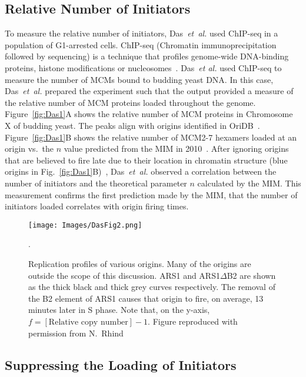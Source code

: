 {		\subsection{Relative Number of Initiators}
		\label{subsec:RelativeNo}
		
		To measure the relative number of initiators, Das~\emph{et~al.} used ChIP-seq in a population of G1-arrested cells.
		ChIP-seq (Chromatin immunoprecipitation followed by sequencing) is a technique that profiles genome-wide DNA-binding proteins, histone modifications or nucleosomes~\cite{ChIP-seq}.
		Das~\emph{et al.} used ChIP-seq to measure the number of MCMs bound to budding yeast DNA.
		In this case, Das~\emph{et~al.} prepared the experiment such that the output provided a measure of the relative number of MCM proteins loaded throughout the genome.
		Figure~\ref{fig:Das1}A shows the relative number of MCM proteins in Chromosome X of budding yeast.
		The peaks align with origins identified in OriDB~\cite{OriDB}.
		Figure~\ref{fig:Das1}B shows the relative number of MCM2-7 hexamers loaded at an origin vs.\ the $n$ value predicted from the MIM in 2010~\cite{ScottsPaper}.
		After ignoring origins that are believed to fire late due to their location in chromatin structure (blue origins in Fig.~\ref{fig:Das1}B)~\cite{Chromatin}, Das~\emph{et~al.} observed a correlation between the number of initiators and the theoretical parameter $n$ calculated by the MIM.
		This measurement confirms the first prediction made by the MIM, that the number of initiators loaded correlates with origin firing times.
		
		\begin{figure}[tbh]
			\begin{center}
				\texttt{[image: Images/DasFig2.png]}
			\end{center}
				\caption[Replication Profiles of a Selection of Origins]{\label{fig:Das2} Replication profiles of various origins.
					Many of the origins are outside the scope of this discussion.
					ARS1 and ARS1$\Delta$B2 are shown as the thick black and thick grey curves respectively.
					The removal of the B2 element of ARS1 causes that origin to fire, on average, 13 minutes later in S phase.
					Note that, on the y-axis, $f = [\text{Relative copy number}] - 1$.
					Figure reproduced with permission from N.~Rhind~\cite{Rhind}}.
		\end{figure}
		
		
		\subsection{Suppressing the Loading of Initiators}
		\label{subsec:SuppressingInitiators}
		
}
